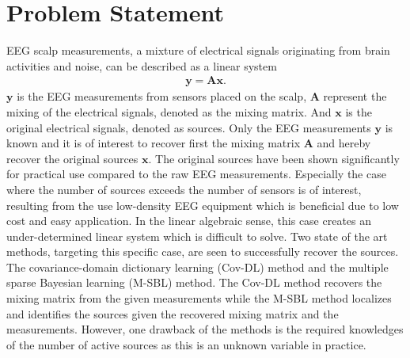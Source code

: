 \chapter{Problem Statement}\label{ch:problemstatement}
EEG scalp measurements, a mixture of electrical signals originating from brain activities and noise, can be described as a linear system
\begin{align*}
\mathbf{y} = \mathbf{Ax}.
\end{align*}
$\mathbf{y}$ is the EEG measurements from sensors placed on the scalp, $\mathbf{A}$ represent the mixing of the electrical signals, denoted as the mixing matrix. And $\mathbf{x}$ is the original electrical signals, denoted as sources. 
Only the EEG measurements $\mathbf{y}$ is known and it is of interest to recover first the mixing matrix $\mathbf{A}$ and hereby recover the original sources $\mathbf{x}$. The original sources have been shown significantly for practical use compared to the raw EEG measurements. 
Especially the case where the number of sources exceeds the number of sensors is of interest, resulting from the use low-density EEG equipment which is beneficial due to low cost and easy application. 
In the linear algebraic sense, this case creates an under-determined linear system which is difficult to solve.
Two state of the art methods, targeting this specific case, are seen to successfully recover the sources. The covariance-domain dictionary learning (Cov-DL) method and the multiple sparse Bayesian learning (M-SBL) method. 
The Cov-DL method recovers the mixing matrix from the given measurements while the M-SBL method localizes and identifies the sources given the recovered mixing matrix and the measurements. 
However, one drawback of the methods is the required knowledges of the number of active sources as this is an unknown variable in practice. 

